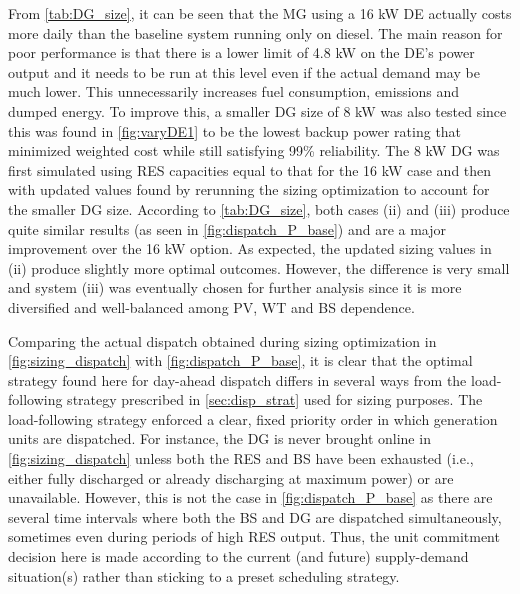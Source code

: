 \documentclass[final,3p,times]{elsarticle}
\begin{document}
From \cref{tab:DG_size}, it can be seen that the MG using a 16 kW DE actually costs more daily than the baseline system running only on diesel. The main reason for poor performance is that there is a lower limit of 4.8 kW on the DE's power output and it needs to be run at this level even if the actual demand may be much lower. This unnecessarily increases fuel consumption, emissions and dumped energy. To improve this, a smaller DG size of 8 kW was also tested since this was found in \cref{fig:varyDE1} to be the lowest backup power rating that minimized weighted cost while still satisfying 99\% reliability. The 8 kW DG was first simulated using RES capacities equal to that for the 16 kW case and then with updated values found by rerunning the sizing optimization to account for the smaller DG size. According to \cref{tab:DG_size}, both cases (ii) and (iii) produce quite similar results (as seen in \cref{fig:dispatch_P_base}) and are a major improvement over the 16 kW option. As expected, the updated sizing values in (ii) produce slightly more optimal outcomes. However, the difference is very small and system (iii) was eventually chosen for further analysis since it is more diversified and well-balanced among PV, WT and BS dependence.

Comparing the actual dispatch obtained during sizing optimization in \cref{fig:sizing_dispatch} with \cref{fig:dispatch_P_base}, it is clear that the optimal strategy found here for day-ahead dispatch differs in several ways from the load-following strategy prescribed in \cref{sec:disp_strat} used for sizing purposes. The load-following strategy enforced a clear, fixed priority order in which generation units are dispatched. For instance, the DG is never brought online in \cref{fig:sizing_dispatch} unless both the RES and BS have been exhausted (i.e., either fully discharged or already discharging at maximum power) or are unavailable. However, this is not the case in \cref{fig:dispatch_P_base} as there are several time intervals where both the BS and DG are dispatched simultaneously, sometimes even during periods of high RES output. Thus, the unit commitment decision here is made according to the current (and future) supply-demand situation(s) rather than sticking to a preset scheduling strategy. 
\end{document}
